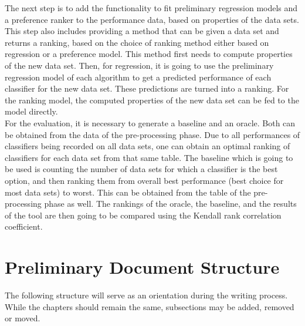 \documentclass[12pt]{scrartcl}
\begin{document}

The next step is to add the functionality to fit preliminary regression models and a preference ranker to the performance data, based on properties of the data sets. This step also includes providing a method that can be given a data set and returns a ranking, based on the choice of ranking method either based on regression or a preference model. This method first needs to compute properties of the new data set. Then, for regression, it is going to use the preliminary regression model of each algorithm to get a predicted performance of each classifier for the new data set. These predictions are turned into a ranking. For the ranking model, the computed properties of the new data set can be fed to the model directly.\\

For the evaluation, it is necessary to generate a baseline and an oracle. Both can be obtained from the data of the pre-processing phase. Due to all performances of classifiers being recorded on all data sets, one can obtain an optimal ranking of classifiers for each data set from that same table. The baseline which is going to be used is counting the number of data sets for which a classifier is the best option, and then ranking them from overall best performance (best choice for most data sets) to worst. This can be obtained from the table of the pre-processing phase as well. The rankings of the oracle, the baseline, and the results of the tool are then going to be compared using the Kendall rank correlation coefficient.

\newpage
\section{Preliminary Document Structure}\label{sec:doc-structure}
The following structure will serve as an orientation during the writing process. While the chapters should remain the same, subsections may be added, removed or moved.
\end{document}

